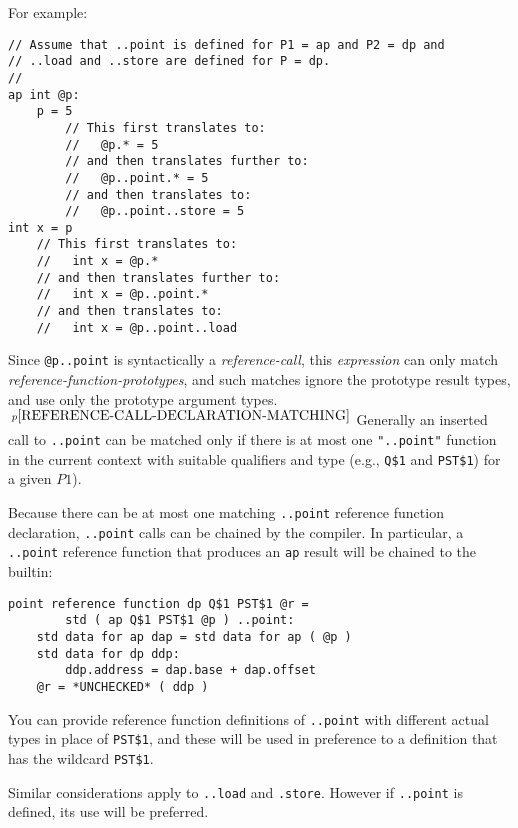 \documentclass[12pt]{article}
\newcommand{\pagnote}[1]{$\,^{p\pageref{#1}}$}
\newenvironment{indpar}[1][0.3in]%
	{\begin{list}{}%
		     {\setlength{\itemsep}{0in}%
		      \setlength{\topsep}{0in}%
		      \setlength{\parsep}{1ex}%
		      \setlength{\labelwidth}{#1}%
		      \setlength{\leftmargin}{#1}%
		      \addtolength{\leftmargin}{\labelsep}}%
	 \item}%
	{\end{list}}
\begin{document}
For example:
\begin{indpar}\begin{verbatim}
// Assume that ..point is defined for P1 = ap and P2 = dp and
// ..load and ..store are defined for P = dp.
//
ap int @p:
    p = 5
        // This first translates to:
        //   @p.* = 5
        // and then translates further to:
        //   @p..point.* = 5
        // and then translates to:
        //   @p..point..store = 5
int x = p
    // This first translates to:
    //   int x = @p.*
    // and then translates further to:
    //   int x = @p..point.*
    // and then translates to:
    //   int x = @p..point..load
\end{verbatim}\end{indpar}

Since {\tt @p..point} is syntactically a {\em reference-call},
this {\em expression}
can only match {\em reference-function-prototypes}, and such matches
ignore the prototype result types, and use only the prototype
argument types.\pagnote{REFERENCE-CALL-DECLARATION-MATCHING}
Generally an inserted call to {\tt ..point} can be matched only if there
is at most one {\tt "..point"} function in the current context
with suitable qualifiers and type (e.g., {\tt Q\$1} and {\tt PST\$1})
for a given $P1$).

Because there can be at most one matching {\tt ..point} reference function
declaration, {\tt ..point} calls can be chained by the compiler.  In particular,
a {\tt ..point} reference function that produces an {\tt ap} result will
be chained to the builtin:
\begin{indpar}\begin{verbatim}
point reference function dp Q$1 PST$1 @r =
        std ( ap Q$1 PST$1 @p ) ..point:
    std data for ap dap = std data for ap ( @p )
    std data for dp ddp:
        ddp.address = dap.base + dap.offset
    @r = *UNCHECKED* ( ddp )
\end{verbatim}\end{indpar}

You can provide reference function definitions of {\tt ..point}
with different actual
types in place of {\tt PST\$1}, and these will be used in preference
to a definition that has the wildcard {\tt PST\$1}.

Similar considerations apply to {\tt ..load} and {\tt .store}.  However
if {\tt ..point} is defined, its use will be preferred.
\end{document}
